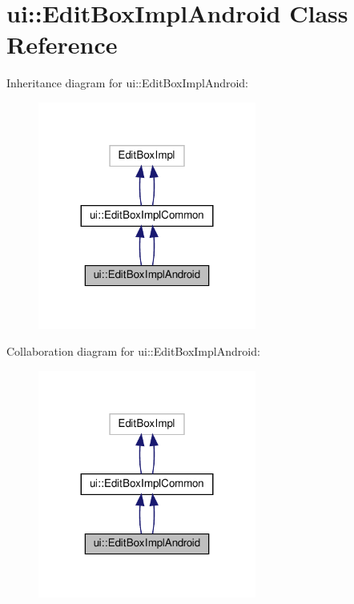 \hypertarget{classui_1_1EditBoxImplAndroid}{}\section{ui\+:\+:Edit\+Box\+Impl\+Android Class Reference}
\label{classui_1_1EditBoxImplAndroid}


Inheritance diagram for ui\+:\+:Edit\+Box\+Impl\+Android\+:
\nopagebreak
\begin{figure}[H]
\begin{center}
\leavevmode
\includegraphics[width=203pt]{classui_1_1EditBoxImplAndroid__inherit__graph}
\end{center}
\end{figure}


Collaboration diagram for ui\+:\+:Edit\+Box\+Impl\+Android\+:
\nopagebreak
\begin{figure}[H]
\begin{center}
\leavevmode
\includegraphics[width=203pt]{classui_1_1EditBoxImplAndroid__coll__graph}
\end{center}
\end{figure}
